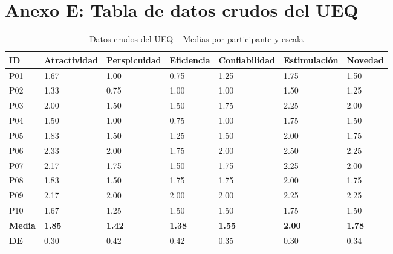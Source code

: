 \documentclass[a4paper,12pt]{report}
\begin{document}
\section*{Anexo E: Tabla de datos crudos del UEQ}

\begin{table}[H]
    \centering
    \scriptsize
    \caption{Datos crudos del UEQ -- Medias por participante y escala}
    \label{tab:datos_crudos_ueq}
    \begin{tabular}{p{1cm} p{2.2cm} p{2.2cm} p{2.2cm} p{2.2cm} p{2.2cm} p{2.2cm}}
        \toprule
        \textbf{ID} & \textbf{Atractividad} & \textbf{Perspicuidad} & \textbf{Eficiencia} & \textbf{Confiabilidad} & \textbf{Estimulación} & \textbf{Novedad} \\
        \midrule
        P01 & 1.67 & 1.00 & 0.75 & 1.25 & 1.75 & 1.50 \\
        P02 & 1.33 & 0.75 & 1.00 & 1.00 & 1.50 & 1.25 \\
        P03 & 2.00 & 1.50 & 1.50 & 1.75 & 2.25 & 2.00 \\
        P04 & 1.50 & 1.00 & 0.75 & 1.00 & 1.75 & 1.50 \\
        P05 & 1.83 & 1.50 & 1.25 & 1.50 & 2.00 & 1.75 \\
        P06 & 2.33 & 2.00 & 1.75 & 2.00 & 2.50 & 2.25 \\
        P07 & 2.17 & 1.75 & 1.50 & 1.75 & 2.25 & 2.00 \\
        P08 & 1.83 & 1.50 & 1.75 & 1.75 & 2.00 & 1.75 \\
        P09 & 2.17 & 2.00 & 2.00 & 2.00 & 2.25 & 2.25 \\
        P10 & 1.67 & 1.25 & 1.50 & 1.50 & 1.75 & 1.50 \\
        \midrule
        \textbf{Media} & \textbf{1.85} & \textbf{1.42} & \textbf{1.38} & \textbf{1.55} & \textbf{2.00} & \textbf{1.78} \\
        \textbf{DE} & 0.30 & 0.42 & 0.42 & 0.35 & 0.30 & 0.34 \\
        \bottomrule
    \end{tabular}
\end{table}
\end{document}
